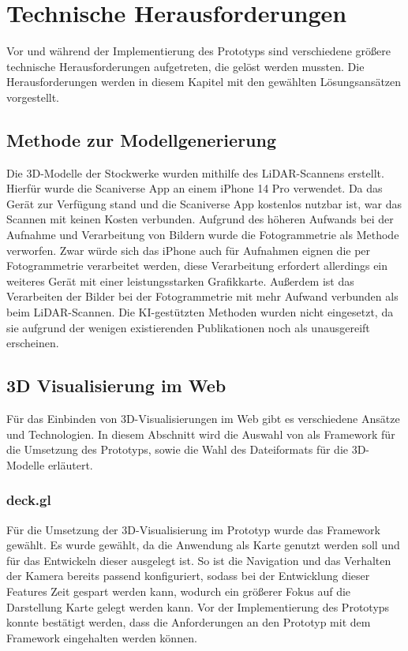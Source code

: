 \newpage
\section{Technische Herausforderungen}
Vor und während der Implementierung des Prototyps sind verschiedene größere technische Herausforderungen aufgetreten, die gelöst werden mussten. Die Herausforderungen werden in diesem Kapitel mit den gewählten Lösungsansätzen vorgestellt. 

\subsection{Methode zur Modellgenerierung}
Die 3D-Modelle der Stockwerke wurden mithilfe des LiDAR-Scannens erstellt. Hierfür wurde die Scaniverse App an einem iPhone 14 Pro verwendet. Da das Gerät zur Verfügung stand und die Scaniverse App kostenlos nutzbar ist, war das Scannen mit keinen Kosten verbunden. Aufgrund des höheren Aufwands bei der Aufnahme und Verarbeitung von Bildern wurde die Fotogrammetrie als Methode verworfen. Zwar würde sich das iPhone auch für Aufnahmen eignen die per Fotogrammetrie verarbeitet werden, diese Verarbeitung erfordert allerdings ein weiteres Gerät mit einer leistungsstarken Grafikkarte. Außerdem ist das Verarbeiten der Bilder bei der Fotogrammetrie mit mehr Aufwand verbunden als beim \ac{LiDAR}-Scannen. Die KI-gestützten Methoden wurden nicht eingesetzt, da sie aufgrund der wenigen existierenden Publikationen noch als unausgereift erscheinen.

\subsection{3D Visualisierung im Web}
Für das Einbinden von 3D-Visualisierungen im Web gibt es verschiedene Ansätze und Technologien. In diesem Abschnitt wird die Auswahl von \deckgl{} als Framework für die Umsetzung des Prototyps, sowie die Wahl des Dateiformats für die 3D-Modelle erläutert.

\subsubsection{deck.gl}
Für die Umsetzung der 3D-Visualisierung im Prototyp wurde das Framework \deckgl{} gewählt. Es wurde gewählt, da die Anwendung als Karte genutzt werden soll und \deckgl{} für das Entwickeln dieser ausgelegt ist. So ist die Navigation und das Verhalten der Kamera bereits passend konfiguriert, sodass bei der Entwicklung dieser Features Zeit gespart werden kann, wodurch ein größerer Fokus auf die Darstellung Karte gelegt werden kann. Vor der Implementierung des Prototyps konnte bestätigt werden, dass die Anforderungen an den Prototyp mit dem Framework eingehalten werden können.

